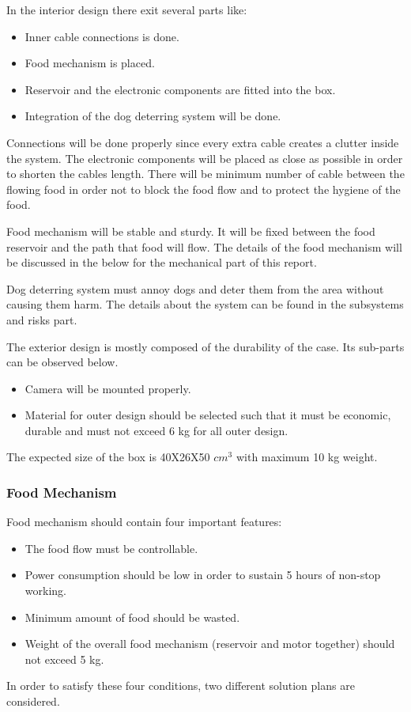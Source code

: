 In the interior design there exit several parts like:
\begin{itemize}
    \item Inner cable connections is done.
    \item Food mechanism is placed.
    \item Reservoir and the electronic components are fitted into the box.
    \item Integration of the dog deterring system will be done. 
\end{itemize}
Connections will be done properly since every extra cable creates a clutter inside the system. The electronic components will be placed as close as possible in order to shorten the cables length. There will be minimum number of cable between the flowing food in order not to block the food flow and to protect the hygiene of the food. 

Food mechanism will be stable and sturdy. It will be fixed between the food reservoir and the path that food will flow. The details of the food mechanism will be discussed in the below for the mechanical part of this report.

Dog deterring system must annoy dogs and deter them from the area without causing them harm. The details about the system can be found in the subsystems and risks part.

The exterior design is mostly composed of the durability of the case. Its sub-parts can be observed below.
\begin{itemize}
    \item Camera will be mounted properly.
    \item Material for outer design should be selected such that it must be economic, durable and must not exceed 6 kg for all outer design.
\end{itemize}

The expected size of the box is 40X26X50 $cm^{3}$ with maximum 10 kg weight.

\subsubsection{Food Mechanism}
 Food mechanism should contain four important features:
\begin{itemize}
    \item The food flow must be controllable.
    \item Power consumption should be low in order to sustain 5 hours of non-stop working.
    \item Minimum amount of food should be wasted.
    \item Weight of the overall food mechanism (reservoir and motor together) should not exceed 5 kg.
\end{itemize}
In order to satisfy these four conditions, two different solution plans are considered.
